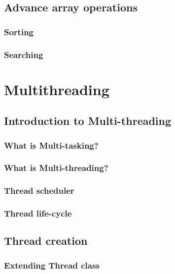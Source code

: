 \documentclass[14pt,fleqn]{extbook} %
\begin{document}
\section{Advance array operations}

\subsection{Sorting}

\subsection{Searching}



\chapter{Multithreading}
\section{Introduction to Multi-threading}
%
\subsection{What is Multi-tasking?}

\subsection{What is Multi-threading?}

\subsection{Thread scheduler}

\subsection{Thread life-cycle}

\section{Thread creation}

\subsection{Extending Thread class}

\end{document}
